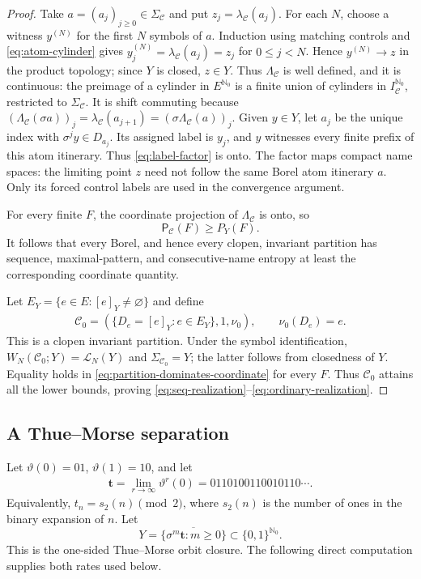 \documentclass[11pt,reqno]{amsart}
\numberwithin{equation}{section}
\theoremstyle{definition}
\theoremstyle{definition}
\newcommand{\Nzero}{\mathbb N_0}
\newcommand{\C}{\mathcal C}
\newcommand{\Lcal}{\mathcal L}
\newcommand{\Patt}{\mathsf P}
\begin{document}
\begin{proof}
Take $a=(a_j)_{j\ge0}\in\Sigma_\C$ and put $z_j=\lambda_\C(a_j)$.  For each
$N$, choose a witness $y^{(N)}$ for the first $N$ symbols of $a$.  Induction
using matching controls and \eqref{eq:atom-cylinder} gives
$y^{(N)}_j=\lambda_\C(a_j)=z_j$ for $0\le j<N$.  Hence
$y^{(N)}\to z$ in the product topology; since $Y$ is closed, $z\in Y$.  Thus
$\Lambda_\C$ is well defined, and it is continuous: the preimage of a cylinder in $E^{\Nzero}$ is a finite
union of cylinders in $I_\C^{\Nzero}$, restricted to $\Sigma_\C$.
It is shift commuting because
$(\Lambda_\C(\sigma a))_j=\lambda_\C(a_{j+1})
=(\sigma\Lambda_\C(a))_j$.  Given $y\in Y$, let $a_j$ be the unique index with
$\sigma^j y\in D_{a_j}$.  Its assigned label is $y_j$, and $y$ witnesses
every finite prefix of this atom itinerary.  Thus \eqref{eq:label-factor} is onto.  The factor maps compact name spaces: the limiting point $z$ need
not follow the same Borel atom itinerary $a$. Only its forced control
labels are used in the convergence argument.

For every finite $F$, the coordinate projection of $\Lambda_\C$ is onto, so
\begin{equation}\label{eq:partition-dominates-coordinate}
 \Patt_\C(F)\ge P_Y(F).
\end{equation}
It follows that every Borel, and hence every clopen, invariant partition has
sequence, maximal-pattern, and consecutive-name entropy at least the
corresponding coordinate quantity.

Let $E_Y=\{e\in E:[e]_Y\ne\varnothing\}$ and define
\begin{align*}
\C_0=(\{D_e=[e]_Y:e\in E_Y\},1,\nu_0),
 \qquad \nu_0(D_e)=e.
\end{align*}
This is a clopen invariant partition.  Under the symbol identification,
$W_N(\C_0;Y)=\Lcal_N(Y)$ and $\Sigma_{\C_0}=Y$; the latter follows from
closedness of $Y$.  Equality holds in \eqref{eq:partition-dominates-coordinate}
for every $F$.  Thus $\C_0$ attains all the lower bounds, proving
\eqref{eq:seq-realization}--\eqref{eq:ordinary-realization}.
\end{proof}


\subsection{A Thue--Morse separation}\label{sec:thue-morse}

Let $\vartheta(0)=01$, $\vartheta(1)=10$, and let
\begin{align*}
 \mathbf t=\lim_{r\to\infty}\vartheta^r(0)
 =0110100110010110\cdots.
\end{align*}
Equivalently, $t_n=s_2(n)\pmod2$, where $s_2(n)$ is the number of ones in
the binary expansion of $n$.  Let
\begin{equation}\label{eq:thue-morse-shift}
 Y=\overline{\{\sigma^m\mathbf t:m\ge0\}}
 \subset\{0,1\}^{\Nzero}.
\end{equation}
This is the one-sided Thue--Morse orbit closure.  The following direct computation supplies both rates used below.
\end{document}
